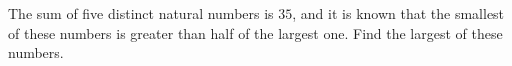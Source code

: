 The sum of five distinct natural numbers is $35$, and it is known that the smallest of these numbers is greater than half of the largest one. Find the largest of these numbers.

